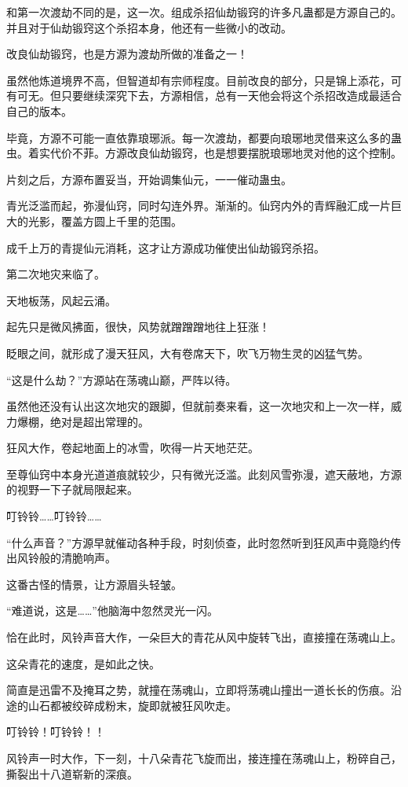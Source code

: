 \begin{this_body}
和第一次渡劫不同的是，这一次。组成杀招仙劫锻窍的许多凡蛊都是方源自己的。并且对于仙劫锻窍这个杀招本身，他还有一些微小的改动。

改良仙劫锻窍，也是方源为渡劫所做的准备之一！

虽然他炼道境界不高，但智道却有宗师程度。目前改良的部分，只是锦上添花，可有可无。但只要继续深究下去，方源相信，总有一天他会将这个杀招改造成最适合自己的版本。

毕竟，方源不可能一直依靠琅琊派。每一次渡劫，都要向琅琊地灵借来这么多的蛊虫。着实代价不菲。方源改良仙劫锻窍，也是想要摆脱琅琊地灵对他的这个控制。

片刻之后，方源布置妥当，开始调集仙元，一一催动蛊虫。

青光泛滥而起，弥漫仙窍，同时勾连外界。渐渐的。仙窍内外的青辉融汇成一片巨大的光影，覆盖方圆上千里的范围。

成千上万的青提仙元消耗，这才让方源成功催使出仙劫锻窍杀招。

第二次地灾来临了。

天地板荡，风起云涌。

起先只是微风拂面，很快，风势就蹭蹭蹭地往上狂涨！

眨眼之间，就形成了漫天狂风，大有卷席天下，吹飞万物生灵的凶猛气势。

“这是什么劫？”方源站在荡魂山巅，严阵以待。

虽然他还没有认出这次地灾的跟脚，但就前奏来看，这一次地灾和上一次一样，威力爆棚，绝对是超出常理的。

狂风大作，卷起地面上的冰雪，吹得一片天地茫茫。

至尊仙窍中本身光道道痕就较少，只有微光泛滥。此刻风雪弥漫，遮天蔽地，方源的视野一下子就局限起来。

叮铃铃……叮铃铃……

“什么声音？”方源早就催动各种手段，时刻侦查，此时忽然听到狂风声中竟隐约传出风铃般的清脆响声。

这番古怪的情景，让方源眉头轻皱。

“难道说，这是……”他脑海中忽然灵光一闪。

恰在此时，风铃声音大作，一朵巨大的青花从风中旋转飞出，直接撞在荡魂山上。

这朵青花的速度，是如此之快。

简直是迅雷不及掩耳之势，就撞在荡魂山，立即将荡魂山撞出一道长长的伤痕。沿途的山石都被绞碎成粉末，旋即就被狂风吹走。

叮铃铃！叮铃铃！！

风铃声一时大作，下一刻，十八朵青花飞旋而出，接连撞在荡魂山上，粉碎自己，撕裂出十八道崭新的深痕。


\end{this_body}
